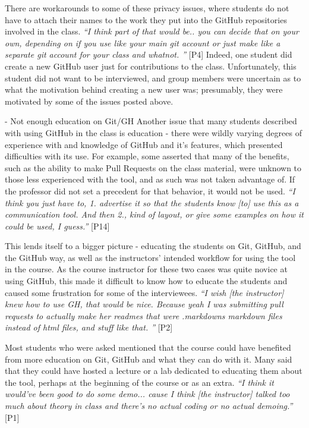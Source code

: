 There are workarounds to some of these privacy issues, where students do not have to attach their names to the work they put into the GitHub repositories involved in the class. \textit{``I think part of that would be.. you can decide that on your own, depending on if you use like your main git account or just make like a separate git account for your class and whatnot. ''} [P4] Indeed, one student did create a new GitHub user just for contributions to the class. Unfortunately, this student did not want to be interviewed, and group members were uncertain as to what the motivation behind creating a new user was; presumably, they were motivated by some of the issues posted above.

- Not enough education on Git/GH
Another issue that many students described with using GitHub in the class is education - there were wildly varying degrees of experience with and knowledge of GitHub and it's features, which presented difficulties with its use. For example, some asserted that many of the benefits, such as the ability to make Pull Requests on the class material, were unknown to those less experienced with the tool, and as such was not taken advantage of. If the professor did not set a precedent for that behavior, it would not be used. \textit{``I think you just have to, 1. advertise it so that the students know [to] use this as a communication tool. And then 2., kind of layout, or give some examples on how it could be used, I guess.''} [P14]

This lends itself to a bigger picture - educating the students on Git, GitHub, and the GitHub way, as well as the instructors' intended workflow for using the tool in the course. As the course instructor for these two cases was quite novice at using GitHub, this made it difficult to know how to educate the students and caused some frustration for some of the interviewees. \textit{``I wish [the instructor] knew how to use GH, that would be nice. Because yeah I was submitting pull requests to actually make her readmes that were .markdowns markdown files instead of html files, and stuff like that. ''} [P2]

Most students who were asked mentioned that the course could have benefited from more education on Git, GitHub and what they can do with it. Many said that they could have hosted a lecture or a lab dedicated to educating them about the tool, perhaps at the beginning of the course or as an extra. \textit{``I think it would've been good to do some demo... cause I think [the instructor] talked too much about theory in class and there's no actual coding or no actual demoing.''} [P1]

